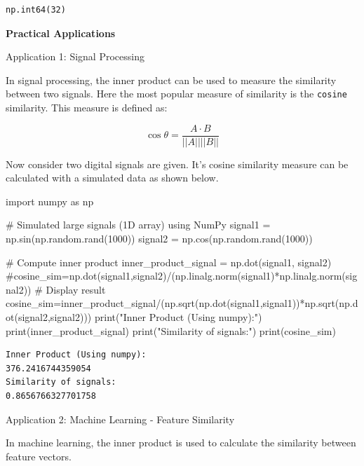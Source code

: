 \documentclass[
  letterpaper,
  DIV=11,
  numbers=noendperiod]{scrreprt}
\newenvironment{Shaded}{\begin{snugshade}}{\end{snugshade}}
\newcommand{\BuiltInTok}[1]{\textcolor[rgb]{0.00,0.23,0.31}{#1}}
\newcommand{\CommentTok}[1]{\textcolor[rgb]{0.37,0.37,0.37}{#1}}
\newcommand{\DecValTok}[1]{\textcolor[rgb]{0.68,0.00,0.00}{#1}}
\newcommand{\ImportTok}[1]{\textcolor[rgb]{0.00,0.46,0.62}{#1}}
\newcommand{\NormalTok}[1]{\textcolor[rgb]{0.00,0.23,0.31}{#1}}
\newcommand{\OperatorTok}[1]{\textcolor[rgb]{0.37,0.37,0.37}{#1}}
\newcommand{\StringTok}[1]{\textcolor[rgb]{0.13,0.47,0.30}{#1}}
\theoremstyle{plain}
\theoremstyle{definition}
\theoremstyle{remark}
\begin{document}
\begin{verbatim}
np.int64(32)
\end{verbatim}

\textbf{Practical Applications}

Application 1: Signal Processing

In signal processing, the inner product can be used to measure the
similarity between two signals. Here the most popular measure of
similarity is the \texttt{cosine} similarity. This measure is defined
as:

\[\cos \theta=\dfrac{A\cdot B}{||A|| ||B||}\]

Now consider two digital signals are given. It's cosine similarity
measure can be calculated with a simulated data as shown below.

\begin{Shaded}
\begin{Highlighting}[]
\ImportTok{import}\NormalTok{ numpy }\ImportTok{as}\NormalTok{ np}

\CommentTok{\# Simulated large signals (1D array) using NumPy}
\NormalTok{signal1 }\OperatorTok{=}\NormalTok{ np.sin(np.random.rand(}\DecValTok{1000}\NormalTok{))}
\NormalTok{signal2 }\OperatorTok{=}\NormalTok{ np.cos(np.random.rand(}\DecValTok{1000}\NormalTok{))}

\CommentTok{\# Compute inner product}
\NormalTok{inner\_product\_signal }\OperatorTok{=}\NormalTok{ np.dot(signal1, signal2)}
\CommentTok{\#cosine\_sim=np.dot(signal1,signal2)/(np.linalg.norm(signal1)*np.linalg.norm(signal2))}
\CommentTok{\# Display result}
\NormalTok{cosine\_sim}\OperatorTok{=}\NormalTok{inner\_product\_signal}\OperatorTok{/}\NormalTok{(np.sqrt(np.dot(signal1,signal1))}\OperatorTok{*}\NormalTok{np.sqrt(np.dot(signal2,signal2)))}
\BuiltInTok{print}\NormalTok{(}\StringTok{"Inner Product (Using numpy):"}\NormalTok{)}
\BuiltInTok{print}\NormalTok{(inner\_product\_signal)}
\BuiltInTok{print}\NormalTok{(}\StringTok{"Similarity of signals:"}\NormalTok{)}
\BuiltInTok{print}\NormalTok{(cosine\_sim)}
\end{Highlighting}
\end{Shaded}

\begin{verbatim}
Inner Product (Using numpy):
376.2416744359054
Similarity of signals:
0.8656766327701758
\end{verbatim}

Application 2: Machine Learning - Feature Similarity

In machine learning, the inner product is used to calculate the
similarity between feature vectors.
\end{document}
